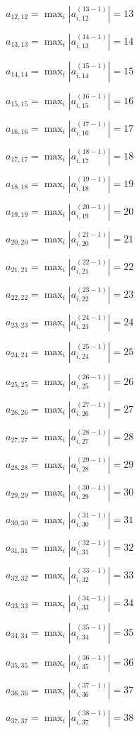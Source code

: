 \documentclass[a4paper,12pt]{article}
\begin{document}
$a _{ 12, 12 } =  \max _i |a _{ i, 12 } ^{ (13 - 1) } | = 13$

$a _{ 13, 13 } =  \max _i |a _{ i, 13 } ^{ (14 - 1) } | = 14$

$a _{ 14, 14 } =  \max _i |a _{ i, 14 } ^{ (15 - 1) } | = 15$

$a _{ 15, 15 } =  \max _i |a _{ i, 15 } ^{ (16 - 1) } | = 16$

$a _{ 16, 16 } =  \max _i |a _{ i, 16 } ^{ (17 - 1) } | = 17$

$a _{ 17, 17 } =  \max _i |a _{ i, 17 } ^{ (18 - 1) } | = 18$

$a _{ 18, 18 } =  \max _i |a _{ i, 18 } ^{ (19 - 1) } | = 19$

$a _{ 19, 19 } =  \max _i |a _{ i, 19 } ^{ (20 - 1) } | = 20$

$a _{ 20, 20 } =  \max _i |a _{ i, 20 } ^{ (21 - 1) } | = 21$

$a _{ 21, 21 } =  \max _i |a _{ i, 21 } ^{ (22 - 1) } | = 22$

$a _{ 22, 22 } =  \max _i |a _{ i, 22 } ^{ (23 - 1) } | = 23$

$a _{ 23, 23 } =  \max _i |a _{ i, 23 } ^{ (24 - 1) } | = 24$

$a _{ 24, 24 } =  \max _i |a _{ i, 24 } ^{ (25 - 1) } | = 25$

$a _{ 25, 25 } =  \max _i |a _{ i, 25 } ^{ (26 - 1) } | = 26$

$a _{ 26, 26 } =  \max _i |a _{ i, 26 } ^{ (27 - 1) } | = 27$

$a _{ 27, 27 } =  \max _i |a _{ i, 27 } ^{ (28 - 1) } | = 28$

$a _{ 28, 28 } =  \max _i |a _{ i, 28 } ^{ (29 - 1) } | = 29$

$a _{ 29, 29 } =  \max _i |a _{ i, 29 } ^{ (30 - 1) } | = 30$

$a _{ 30, 30 } =  \max _i |a _{ i, 30 } ^{ (31 - 1) } | = 31$

$a _{ 31, 31 } =  \max _i |a _{ i, 31 } ^{ (32 - 1) } | = 32$

$a _{ 32, 32 } =  \max _i |a _{ i, 32 } ^{ (33 - 1) } | = 33$

$a _{ 33, 33 } =  \max _i |a _{ i, 33 } ^{ (34 - 1) } | = 34$

$a _{ 34, 34 } =  \max _i |a _{ i, 34 } ^{ (35 - 1) } | = 35$

$a _{ 35, 35 } =  \max _i |a _{ i, 35 } ^{ (36 - 1) } | = 36$

$a _{ 36, 36 } =  \max _i |a _{ i, 36 } ^{ (37 - 1) } | = 37$

$a _{ 37, 37 } =  \max _i |a _{ i, 37 } ^{ (38 - 1) } | = 38$
\end{document}

